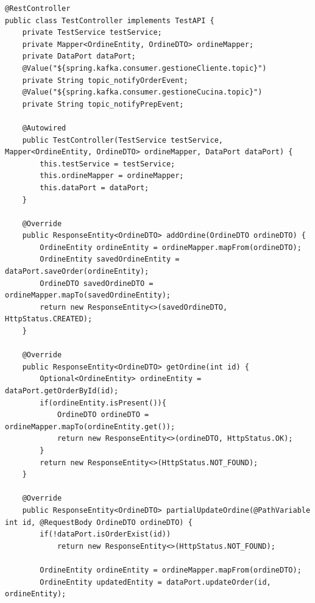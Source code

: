 \begin{lstlisting}[style=myJava, 
    caption={Classe REST Controller di test TestController.java}, label=lst:restcontrollertest, 
    emph={[2] ordineMapper, testService, dataPort, topic_notifyOrderEvent, topic_notifyPrepEvent},
    emphstyle={[2]\color{codeDarkMagenta}},
    emph={[3] addOrdine, getOrdine, getAllOrdersByIdComanda, partialUpdateOrdine, deleteOrder, sendOrderEvent, getMessageFromTopicSendOrderEvent, sendNotifyOrderEvent, getMessageFromTopicNotifyOrderEvent, sendNotifyPrepEvent, getMessageFromTopicNotifyPrepEvent },
    emphstyle={[3]\color{codeCyan}},]
@RestController
public class TestController implements TestAPI {
    private TestService testService;
    private Mapper<OrdineEntity, OrdineDTO> ordineMapper;
    private DataPort dataPort;
    @Value("${spring.kafka.consumer.gestioneCliente.topic}")
    private String topic_notifyOrderEvent;
    @Value("${spring.kafka.consumer.gestioneCucina.topic}")
    private String topic_notifyPrepEvent;
    
    @Autowired
    public TestController(TestService testService, Mapper<OrdineEntity, OrdineDTO> ordineMapper, DataPort dataPort) {
        this.testService = testService;
        this.ordineMapper = ordineMapper;
        this.dataPort = dataPort;
    }

    @Override
    public ResponseEntity<OrdineDTO> addOrdine(OrdineDTO ordineDTO) {
        OrdineEntity ordineEntity = ordineMapper.mapFrom(ordineDTO);
        OrdineEntity savedOrdineEntity = dataPort.saveOrder(ordineEntity);
        OrdineDTO savedOrdineDTO = ordineMapper.mapTo(savedOrdineEntity);
        return new ResponseEntity<>(savedOrdineDTO, HttpStatus.CREATED);
    }

    @Override
    public ResponseEntity<OrdineDTO> getOrdine(int id) {
        Optional<OrdineEntity> ordineEntity = dataPort.getOrderById(id);
        if(ordineEntity.isPresent()){
            OrdineDTO ordineDTO = ordineMapper.mapTo(ordineEntity.get());
            return new ResponseEntity<>(ordineDTO, HttpStatus.OK);
        }
        return new ResponseEntity<>(HttpStatus.NOT_FOUND);
    }

    @Override
    public ResponseEntity<OrdineDTO> partialUpdateOrdine(@PathVariable int id, @RequestBody OrdineDTO ordineDTO) {
        if(!dataPort.isOrderExist(id))
            return new ResponseEntity<>(HttpStatus.NOT_FOUND);

        OrdineEntity ordineEntity = ordineMapper.mapFrom(ordineDTO);
        OrdineEntity updatedEntity = dataPort.updateOrder(id, ordineEntity);


\end{lstlisting}
